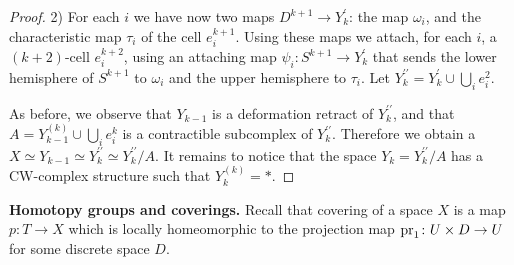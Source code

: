 \begin{proof}
\item[2)] For each $i$ we have now two maps $D^{k+1}\to Y^{\prime}_{k}$:
the map $\omega_{i}$, and the characteristic map $\tau_{i}$ of the cell $e^{k+1}_{i}$.
Using these maps we attach, for each $i$, a $(k+2)$-cell $e^{k+2}_{i}$, 
using an attaching map $\psi_{i}\colon S^{k+1} \to Y^{\prime}_{k}$ that sends the 
lower hemisphere of $S^{k+1}$ to $\omega_{i}$ and the upper hemisphere to $\tau_{i}$. 
Let $Y^{\prime \prime}_{k} = Y^{\prime}_{k} \cup \bigcup_{i} e^{2}_{i}$. 
\eenu

As before, we observe that $Y_{k-1}$ is a deformation retract of $Y^{\prime \prime}_{k}$, 
and that $A = Y_{k-1}^{(k)}\cup \bigcup_{i} e^{k}_{i}$ is a contractible subcomplex
of $Y^{\prime \prime}_{k}$. Therefore we obtain a 
$X\simeq Y_{k-1} \simeq Y^{\prime \prime}_{k}\simeq Y^{\prime \prime}_{k}/A$. It remains
to notice that the space $Y_{k} = Y^{\prime \prime}_{k}/A$ has a CW-complex structure 
such that $Y_{k}^{(k)} = \ast$. 

\end{proof}



\begin{nn}{\bf Homotopy groups and coverings.}
Recall that covering of a space $X$ is a map $p\colon T\to X$ which is locally 
homeomorphic to the projection map $\operatorname{pr}_{1}\colon U\times D \to U$ for some discrete 
space $D$. 
\end{nn}


